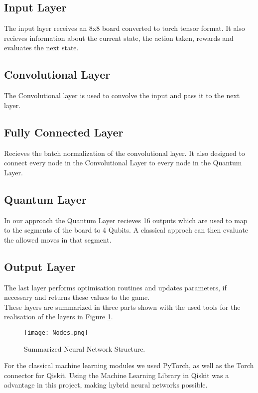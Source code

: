 \documentclass[conference]{IEEEtran}
\begin{document}
\subsection{Input Layer}
The input layer receives an 8x8 board converted to torch tensor format. It also recieves information about the current state, the action taken, rewards and evaluates the next state.

\subsection{Convolutional Layer}
The Convolutional layer is used to convolve the input and pass it to the next layer. 

\subsection{Fully Connected Layer}
Recieves the batch normalization of the convolutional layer. It also designed to connect every node in the Convolutional Layer to every node in the Quantum Layer. 

\subsection{Quantum Layer}
In our approach the Quantum Layer recieves 16 outputs which are used to map to the segments of the board to 4 Qubits. A classical approch can then evaluate the allowed moves in that segment. 

\subsection{Output Layer}
The last layer performs optimisation routines and updates parameters, if necessary and returns these values to the game. 
\\ 

These layers are summarized in three parts shown with the used tools for the realisation of the layers in Figure \ref{nodes}. 
\begin{figure}[htbp]
	\centerline{\texttt{[image: Nodes.png]}}
	\caption{Summarized Neural Network Structure.}
	\label{nodes}
\end{figure}

For the classical machine learning modules we used PyTorch, as well as the Torch connector for Qiskit. Using the Machine Learning Library in Qiskit was a advantage in this project, making hybrid neural networks possible. 
\end{document}
